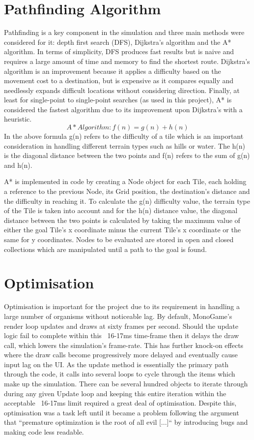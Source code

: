 \documentclass[a4paper, oneside, 11pt]{report}
\begin{document}
\section{Pathfinding Algorithm}\label{pathfinding}
Pathfinding is a key component in the simulation and three main methods were considered for it: depth first search (DFS), Dijkstra's algorithm and the A* algorithm. In terms of simplicity, DFS produces fast results but is naive and requires a large amount of time and memory to find the shortest route. Dijkstra's algorithm is an improvement because it applies a difficulty based on the movement cost to a destination, but is expensive as it compares equally and needlessly expands difficult locations without considering direction. Finally, at least for single-point to single-point searches (as used in this project), A* is considered the fastest algorithm \cite{belwariar} due to its improvement upon Dijkstra's with a heuristic. 
\[A* Algorithm: f(n) = g(n) + h(n)\]
In the above formula g(n) refers to the difficulty of a tile which is an important consideration in handling different terrain types such as hills or water. The h(n) is the diagonal distance between the two points and f(n) refers to the sum of g(n) and h(n).

A* is implemented in code by creating a Node object for each Tile, each holding a reference to the previous Node, its Grid position, the destination's distance and the difficulty in reaching it. To calculate the g(n) difficulty value, the terrain type of the Tile is taken into account and for the h(n) distance value, the diagonal distance between the two points is calculated by taking the maximum value of either the goal Tile's x coordinate minus the current Tile's x coordinate or the same for y coordinates. Nodes to be evaluated are stored in open and closed collections which are manipulated until a path to the goal is found.

\section{Optimisation}\label{optim}
Optimisation is important for the project due to its requirement in handling a large number of organisms without noticeable lag. By default, MonoGame's render loop updates and draws at sixty frames per second. Should the update logic fail to complete within this ~16-17ms time-frame then it delays the draw call, which lowers the simulation's frame-rate. This has further knock-on effects where the draw calls become progressively more delayed and eventually cause input lag on the UI. As the update method is essentially the primary path through the code, it calls into several loops to cycle through the items which make up the simulation. There can be several hundred objects to iterate through during any given Update loop and keeping this entire iteration within the acceptable ~16-17ms limit required a great deal of optimisation. Despite this, optimisation was a task left until it became a problem following the argument that ``premature optimization is the root of all evil [...]`` \cite{knuth} by introducing bugs and making code less readable. 
\end{document}
